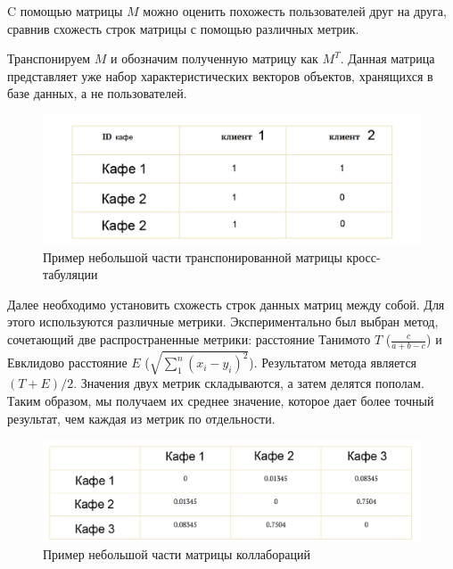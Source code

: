C помощью матрицы $M$ можно оценить похожесть пользователей друг на друга, сравнив схожесть строк матрицы с помощью различных метрик.

Транспонируем $M$ и обозначим полученную матрицу как $M^{T}$. Данная матрица представляет уже набор характеристических векторов объектов, хранящихся в базе данных, а не пользователей.
 
\begin{figure}[H]%
	\centering
	\includegraphics[width=\textwidth]{img/matrix2.png}
	\caption{\label{fig:tan-aus}Пример небольшой части транспонированной матрицы кросс-табуляции}
\end{figure} 

Далее необходимо установить схожесть строк данных матриц между собой. Для этого используются различные метрики. Экспериментально был выбран метод, сочетающий две распространенные метрики: расстояние Танимото $T$ ($\frac{c}{a+b-c}$) и Евклидово расстояние $E$ ($\sqrt{\sum_{1}^{n} (x_i - y_i)^2} $). Результатом метода является $(T+E)/2$. Значения двух метрик складываются, а затем делятся пополам. Таким образом, мы получаем их среднее значение, которое дает более точный результат, чем каждая из метрик по отдельности.   

\begin{figure}[H]%
	\centering
	\includegraphics[width=\textwidth]{img/matrix3.png}
	\caption{\label{fig:tan-aus}Пример небольшой части матрицы коллабораций}
\end{figure} 

